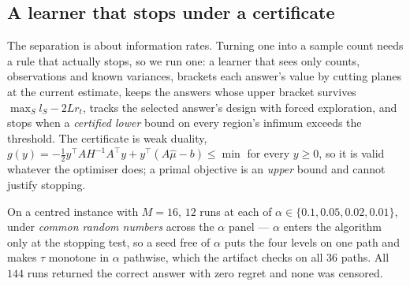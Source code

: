 

\subsection{A learner that stops under a certificate}
\label{sec:learner}

The separation is about information rates. Turning one into a sample count needs a rule that
actually stops, so we run one: a learner that sees only counts, observations and known
variances, brackets each answer's value by cutting planes at the current estimate, keeps the
answers whose upper bracket survives $\max_{S}l_{S}-2Lr_{t}$, tracks the selected answer's
design with forced exploration, and stops when a \emph{certified lower} bound on every
region's infimum exceeds the threshold. The certificate is weak duality,
$g(y)=-\tfrac12y^{\top}AH^{-1}A^{\top}y+y^{\top}(A\hat\mu-b)\le\min$ for every $y\ge0$, so
it is valid whatever the optimiser does; a primal objective is an \emph{upper} bound and
cannot justify stopping.

On a centred instance with $M=16$, $12$ runs at each of
$\alpha\in\{0.1,0.05,0.02,0.01\}$, under \emph{common random numbers} across the
$\alpha$ panel --- $\alpha$ enters the algorithm only at the stopping test, so a seed free
of $\alpha$ puts the four levels on one path and makes $\tau$ monotone in $\alpha$
pathwise, which the artifact checks on all $36$ paths. All $144$ runs returned the correct
answer with zero regret and none was censored.

